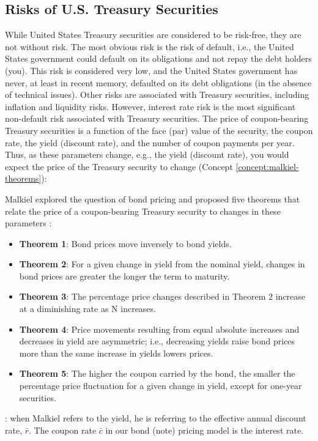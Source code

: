 \documentclass[11pt]{article}
\theoremstyle{definition}
\begin{document}
\subsection{Risks of U.S. Treasury Securities}
While United States Treasury securities are considered to be risk-free, they are not without risk. The most obvious risk is the risk of default, i.e., the United States government could default on its obligations and not repay the debt holders (you).
This risk is considered very low, and the United States government has never, at least in recent memory, defaulted on its debt obligations (in the absence of technical issues). Other risks are associated with Treasury securities, including inflation and liquidity risks.
However, interest rate risk is the most significant non-default risk associated with Treasury securities.
The price of coupon-bearing Treasury securities is a function of the face (par) value of the security, the coupon rate, the yield (discount rate), and the number of coupon payments per year.
Thus, as these parameters change, e.g., the yield (discount rate), you would expect the price of the Treasury security to change (Concept \ref{concept:malkiel-theorems}):

\begin{concept}\label{concept:malkiel-theorems}
	Malkiel explored the question of bond pricing and proposed five theorems that relate the price of a coupon-bearing Treasury security to 
	changes in these parameters \citep{Malkiel-Bonds-1962}:
\begin{itemize}[leftmargin=*]
\item{\textbf{Theorem 1}: Bond prices move inversely to bond yields.}
\item{\textbf{Theorem 2}: For a given change in yield from the nominal yield, changes in bond prices are greater the longer the term to maturity. }
\item{\textbf{Theorem 3}: The percentage price changes described in Theorem 2 increase at a diminishing rate as N increases. }
\item{\textbf{Theorem 4}: Price movements resulting from equal absolute increases and decreases in yield are asymmetric; i.e., decreasing yields raise bond prices more than the same increase in yields lowers prices. }
\item{\textbf{Theorem 5}: The higher the coupon carried by the bond, the smaller the percentage price fluctuation for a given change in yield, except for one-year securities.}
\end{itemize}
\vspace{0.01in}
: when Malkiel refers to the yield, he is referring to the effective annual discount rate, $\bar{r}$. The coupon rate $\bar{c}$ in our bond (note) pricing model is the interest rate.
\end{concept}
\end{document}
